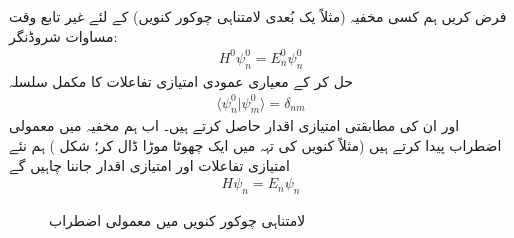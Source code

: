 
فرض کریں ہم کسی مخفیہ (مثلاً   یک  بُعدی لامتناہی چوکور کنویں) کے لئے غیر تابع وقت مساوات شروڈنگر:
\begin{align}\label{مساوات_اضطراب_پہلی}
H^0\psi_n^0=E_n^0\psi_n^0
\end{align}
حل کر کے معیاری عمودی امتیازی تفاعلات  کا مکمل سلسلہ
\begin{align}
\langle \psi_n^0 | \psi_m^0 \rangle = \delta_{nm}
\end{align}
اور ان کی مطابقتی امتیازی اقدار  حاصل کرتے ہیں۔ اب ہم مخفیہ میں معمولی اضطراب پیدا کرتے ہیں (مثلاً کنویں کی تہہ میں ایک چھوٹا موڑا ڈال کر؛  شکل ) ہم  نئے  امتیازی تفاعلات اور امتیازی اقدار جاننا چاہیں گے
\begin{align}\label{مساوات_اضطراب_بنیادی}
H\psi_n = E_n\psi_n
\end{align}
%
\begin{figure}
\centering
{}
\caption{لامتناہی چوکور کنویں میں معمولی اضطراب}
\label{شکل_غیر_تابع_اضطراب_چکور_معمولی}
\end{figure}

